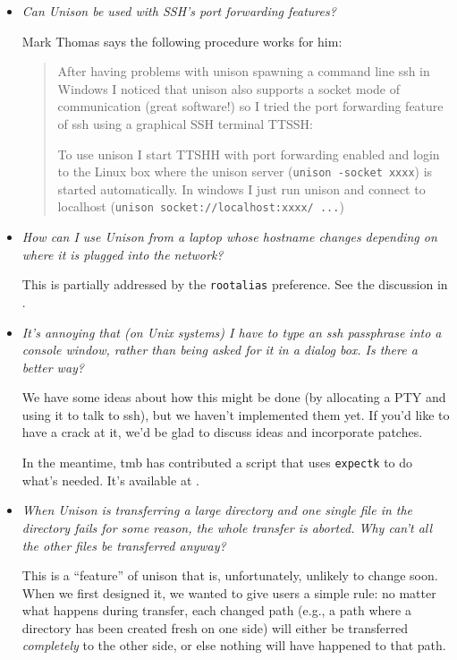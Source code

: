 \begin{itemize}
\item {\em Can Unison be used with SSH's port forwarding features?}

Mark Thomas says the following procedure works for him:
\begin{quote}
After having problems with unison spawning a command line ssh in Windows
I noticed that unison also supports a socket mode of communication (great
software!) so I tried the port forwarding feature of ssh using a
graphical SSH terminal TTSSH:
\begin{quote}
\end{quote}

To use unison I start TTSHH with port forwarding enabled and login to 
the Linux box where the unison server (\verb|unison -socket xxxx|) is 
started automatically.  In windows I just run unison and 
connect to localhost (\verb|unison socket://localhost:xxxx/ ...|)
\end{quote}

\item {\em How can I use Unison from a laptop whose hostname changes
  depending on where it is plugged into the network?}

This is partially addressed by the {\tt rootalias} preference.  See the
discussion in .

\item {\em It's annoying that (on Unix systems) I have to type an ssh
  passphrase into a console window, rather than being asked for it in a
  dialog box.  Is there a better way?}

We have some ideas about how this might be done (by allocating a PTY and
using it to talk to ssh), but we haven't implemented them yet.  If you'd
like to have a crack at it, we'd be glad to discuss ideas and incorporate
patches.  

In the meantime, tmb has contributed a script that uses {\tt expectk} to
do what's needed.  It's available at
.

\item {\em When Unison is transferring a large directory and one single
  file in the directory fails for some reason, the whole transfer is
  aborted.  Why can't all the other files be transferred anyway?}

This is a ``feature'' of unison that is, unfortunately, unlikely to
change soon.  When we first designed it, we wanted to give users a simple
rule: no matter what happens during transfer, each changed path (e.g., a
path where a directory has been created fresh on one side) will either be
transferred {\em completely} to the other side, or else nothing will have
happened to that path.


\end{itemize}

